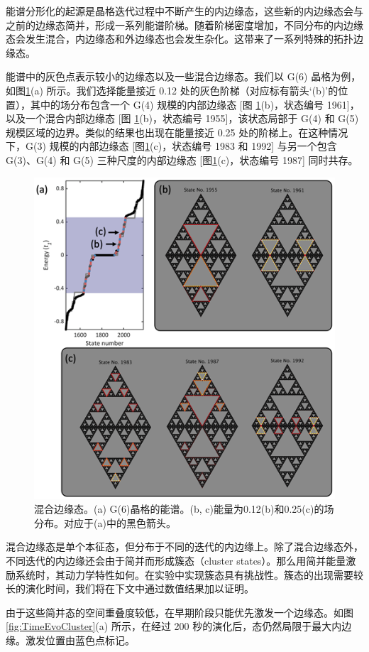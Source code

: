 能谱分形化的起源是晶格迭代过程中不断产生的内边缘态，这些新的内边缘态会与之前的边缘态简并，形成一系列能谱阶梯。随着阶梯密度增加，不同分布的内边缘态会发生混合，内边缘态和外边缘态也会发生杂化。这带来了一系列特殊的拓扑边缘态。

能谱中的灰色点表示较小的边缘态以及一些混合边缘态。我们以 G(6) 晶格为例，如图\ref{fig:GreyPoint}(a) 所示。我们选择能量接近 0.12 处的灰色阶梯（对应标有箭头‘(b)’的位置），其中的场分布包含一个 G(4) 规模的内部边缘态 [图 \ref{fig:GreyPoint}(b)，状态编号 1961]，以及一个混合内部边缘态 [图 \ref{fig:GreyPoint}(b)，状态编号 1955]，该状态局部于 G(4) 和 G(5) 规模区域的边界。类似的结果也出现在能量接近 0.25 处的阶梯上。在这种情况下，G(3) 规模的内部边缘态 [图\ref{fig:GreyPoint}(c)，状态编号 1983 和 1992] 与另一个包含 G(3)、G(4) 和 G(5) 三种尺度的内部边缘态 [图\ref{fig:GreyPoint}(c)，状态编号 1987] 同时共存。
\begin{figure}[htbp]
    \centering
    \includegraphics[width=0.65\linewidth]{figure/FracHaldTheo/GreyPoint.png}
    \caption{混合边缘态。(a) G(6)晶格的能谱。(b, c)能量为0.12(b)和0.25(c)的场分布。对应于(a)中的黑色箭头。}
    \label{fig:GreyPoint}
\end{figure}

混合边缘态是单个本征态，但分布于不同的迭代的内边缘上。除了混合边缘态外，不同迭代的内边缘还会由于简并而形成簇态（cluster states）。那么用简并能量激励系统时，其动力学特性如何。在实验中实现簇态具有挑战性。簇态的出现需要较长的演化时间，我们将在下文中通过数值结果加以证明。

由于这些简并态的空间重叠度较低，在早期阶段只能优先激发一个边缘态。如图 \ref{fig:TimeEvoCluster}(a) 所示，在经过 200 秒的演化后，态仍然局限于最大内边缘。激发位置由蓝色点标记。

